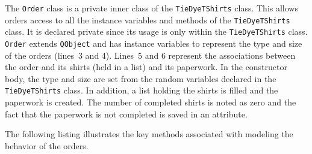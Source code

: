 \documentclass[
]{book}
\theoremstyle{definition}
\theoremstyle{definition}
\theoremstyle{definition}
\theoremstyle{definition}
\theoremstyle{remark}
\begin{document}
The \texttt{Order} class is a private inner class of the
\texttt{TieDyeTShirts} class. This allows orders access to all the instance
variables and methods of the \texttt{TieDyeTShirts} class. It is declared private
since its usage is only within the \texttt{TieDyeTShirts} class. \texttt{Order} extends
\texttt{QObject} and has instance variables to represent the type and size of the
orders (lines~3 and 4). Lines~5 and 6 represent the associations between
the order and its shirts (held in a list) and its paperwork. In the
constructor body, the type and size are set from the random variables
declared in the \texttt{TieDyeTShirts} class. In addition, a list holding the
shirts is filled and the paperwork is created. The number of completed
shirts is noted as zero and the fact that the paperwork is not completed
is saved in an attribute.

The following listing illustrates the key methods associated with
modeling the behavior of the orders.
\end{document}

